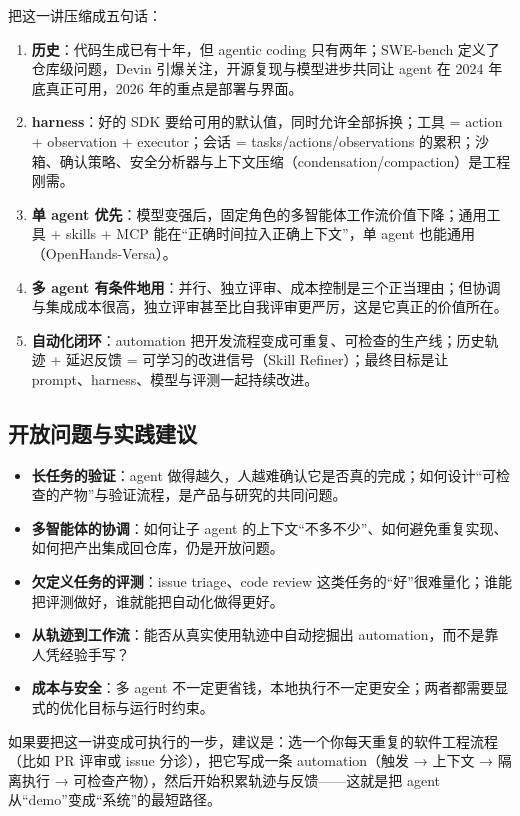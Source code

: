 \documentclass[a4paper]{article}
\begin{document}
把这一讲压缩成五句话：

\begin{enumerate}
\item \textbf{历史}：代码生成已有十年，但 agentic coding 只有两年；SWE-bench 定义了仓库级问题，Devin 引爆关注，开源复现与模型进步共同让 agent 在 2024 年底真正可用，2026 年的重点是部署与界面。
\item \textbf{harness}：好的 SDK 要给可用的默认值，同时允许全部拆换；工具 = action + observation + executor；会话 = tasks/actions/observations 的累积；沙箱、确认策略、安全分析器与上下文压缩（condensation/compaction）是工程刚需。
\item \textbf{单 agent 优先}：模型变强后，固定角色的多智能体工作流价值下降；通用工具 + skills + MCP 能在“正确时间拉入正确上下文”，单 agent 也能通用（OpenHands-Versa）。
\item \textbf{多 agent 有条件地用}：并行、独立评审、成本控制是三个正当理由；但协调与集成成本很高，独立评审甚至比自我评审更严厉，这是它真正的价值所在。
\item \textbf{自动化闭环}：automation 把开发流程变成可重复、可检查的生产线；历史轨迹 + 延迟反馈 = 可学习的改进信号（Skill Refiner）；最终目标是让 prompt、harness、模型与评测一起持续改进。
\end{enumerate}

\subsection{开放问题与实践建议}

\begin{itemize}
\item \textbf{长任务的验证}：agent 做得越久，人越难确认它是否真的完成；如何设计“可检查的产物”与验证流程，是产品与研究的共同问题。
\item \textbf{多智能体的协调}：如何让子 agent 的上下文“不多不少”、如何避免重复实现、如何把产出集成回仓库，仍是开放问题。
\item \textbf{欠定义任务的评测}：issue triage、code review 这类任务的“好”很难量化；谁能把评测做好，谁就能把自动化做得更好。
\item \textbf{从轨迹到工作流}：能否从真实使用轨迹中自动挖掘出 automation，而不是靠人凭经验手写？
\item \textbf{成本与安全}：多 agent 不一定更省钱，本地执行不一定更安全；两者都需要显式的优化目标与运行时约束。
\end{itemize}

如果要把这一讲变成可执行的一步，建议是：选一个你每天重复的软件工程流程（比如 PR 评审或 issue 分诊），把它写成一条 automation（触发 → 上下文 → 隔离执行 → 可检查产物），然后开始积累轨迹与反馈——这就是把 agent 从“demo”变成“系统”的最短路径。
\end{document}
